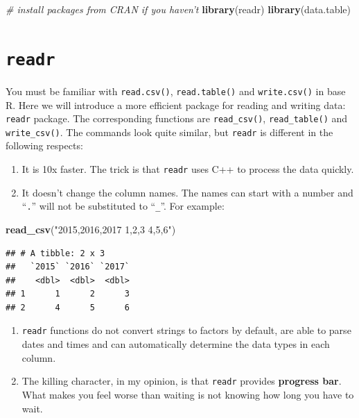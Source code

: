 \documentclass[12pt,]{krantz}
\makeatletter
\newenvironment{Shaded}{\begin{snugshade}}{\end{snugshade}}
\newcommand{\CommentTok}[1]{\textcolor[rgb]{0.37,0.37,0.37}{\textit{#1}}}
\newcommand{\KeywordTok}[1]{\textcolor[rgb]{0.27,0.27,0.27}{\textbf{#1}}}
\newcommand{\NormalTok}[1]{#1}
\newcommand{\StringTok}[1]{\textcolor[rgb]{0.5,0.5,0.5}{#1}}
\newenvironment{kframe}{%
\medskip{}
\setlength{\fboxsep}{.8em}
 \def\at@end@of@kframe{}%
 \ifinner\ifhmode%
  \def\at@end@of@kframe{\end{minipage}}%
  \begin{minipage}{\columnwidth}%
 \fi\fi%
 \def\FrameCommand##1{\hskip\@totalleftmargin \hskip-\fboxsep
 \colorbox{shadecolor}{##1}\hskip-\fboxsep
     \hskip-\linewidth \hskip-\@totalleftmargin \hskip\columnwidth}%
 \MakeFramed {\advance\hsize-\width
   \@totalleftmargin\z@ \linewidth\hsize
   \@setminipage}}%
 {\par\unskip\endMakeFramed%
 \at@end@of@kframe}
\renewenvironment{Shaded}{\begin{kframe}}{\end{kframe}}
\makeatother
\begin{document}
\begin{Shaded}
\begin{Highlighting}[]
\CommentTok{# install packages from CRAN if you haven't}
\KeywordTok{library}\NormalTok{(readr)}
\KeywordTok{library}\NormalTok{(data.table)}
\end{Highlighting}
\end{Shaded}

\hypertarget{readr}{%
\section{\texorpdfstring{\texttt{readr}}{readr}}\label{readr}}

You must be familiar with \texttt{read.csv()}, \texttt{read.table()} and \texttt{write.csv()} in base R. Here we will introduce a more efficient package for reading and writing data: \texttt{readr} package. The corresponding functions are \texttt{read\_csv()}, \texttt{read\_table()} and \texttt{write\_csv()}. The commands look quite similar, but \texttt{readr} is different in the following respects:

\begin{enumerate}
\def\labelenumi{\arabic{enumi}.}
\item
  It is 10x faster. The trick is that \texttt{readr} uses C++ to process the data quickly.
\item
  It doesn't change the column names. The names can start with a number and ``\texttt{.}'' will not be substituted to ``\texttt{\_}''. For example:
\end{enumerate}

\begin{Shaded}
\begin{Highlighting}[]
\KeywordTok{read_csv}\NormalTok{(}\StringTok{"2015,2016,2017}
\StringTok{1,2,3}
\StringTok{4,5,6"}\NormalTok{)}
\end{Highlighting}
\end{Shaded}

\begin{verbatim}
## # A tibble: 2 x 3
##   `2015` `2016` `2017`
##    <dbl>  <dbl>  <dbl>
## 1      1      2      3
## 2      4      5      6
\end{verbatim}

\begin{enumerate}
\def\labelenumi{\arabic{enumi}.}
\item
  \texttt{readr} functions do not convert strings to factors by default, are able to parse dates and times and can automatically determine the data types in each column.
\item
  The killing character, in my opinion, is that \texttt{readr} provides \textbf{progress bar}. What makes you feel worse than waiting is not knowing how long you have to wait.
\end{enumerate}
\end{document}
